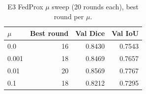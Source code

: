 \begin{table}[t]
\centering
\begin{tabular}{lrrr}
\toprule
$\mu$ & Best round & Val Dice & Val IoU \\
\midrule
0.0 & 16 & 0.8430 & 0.7543 \\
0.001 & 18 & 0.8469 & 0.7657 \\
0.01 & 20 & 0.8569 & 0.7767 \\
0.1 & 18 & 0.8212 & 0.7295 \\
\bottomrule
\end{tabular}
\caption{E3 FedProx $\mu$ sweep (20 rounds each), best round per $\mu$.}
\label{tab:e3-fedprox-sweep}
\end{table}